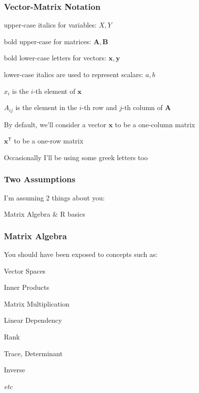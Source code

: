 \documentclass[12pt]{beamer}\usepackage[]{graphicx}\usepackage[]{color}
\begin{document}

\begin{frame}
\frametitle{Vector-Matrix Notation}

\bi
  \item upper-case italics for variables: $X, Y$
  \item bold upper-case for matrices: $\mathbf{A}, \mathbf{B}$
  \item bold lower-case letters for vectors: $\mathbf{x}, \mathbf{y}$
  \item lower-case italics are used to represent scalars: $a, b$
  \item $x_i$ is the $i$-th element of $\mathbf{x}$
  \item $A_{ij}$ is the element in the $i$-th row and $j$-th column of $\mathbf{A}$
  \item By default, we'll consider a vector $\mathbf{x}$ to be a one-column matrix
  \item $\mathbf{x}^\mathsf{T}$ to be a one-row matrix
  \item Occasionally I'll be using some greek letters too
\ei

\end{frame}


\begin{frame}
\frametitle{Two Assumptions}

\centerline{\mdlit \Large I'm assuming 2 things about you:}

\bigskip
\centerline{\Large Matrix Algebra \quad \& \quad R basics}

\end{frame}


\begin{frame}
\frametitle{Matrix Algebra}

You should have been exposed to concepts such as:

\bi
  \item Vector Spaces
  \item Inner Products
  \item Matrix Multiplication
  \item Linear Dependency
  \item Rank
  \item Trace, Determinant
  \item Inverse
  \item \textit{etc}
\ei

\end{frame}
\end{document}
